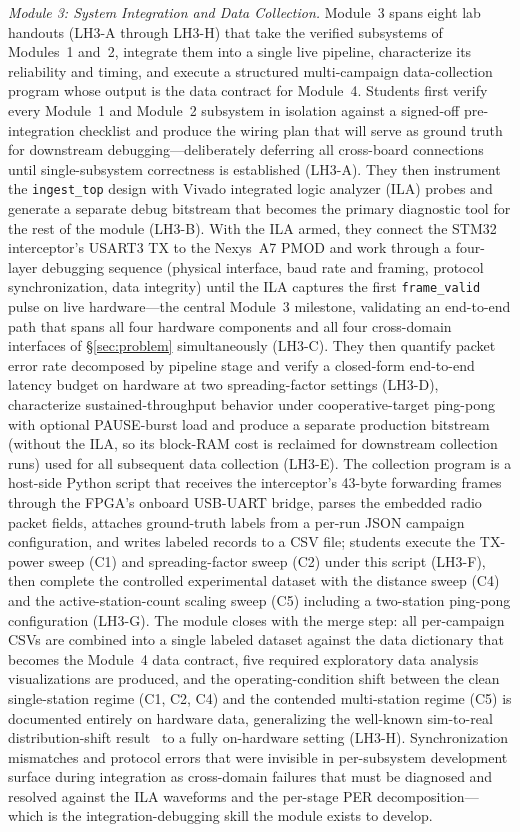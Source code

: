 \documentclass[conference]{IEEEtran}
\begin{document}
\textit{Module 3: System Integration and Data Collection.} Module~3 spans eight lab handouts (LH3-A through LH3-H) that take the verified subsystems of Modules~1 and~2, integrate them into a single live pipeline, characterize its reliability and timing, and execute a structured multi-campaign data-collection program whose output is the data contract for Module~4. Students first verify every Module~1 and Module~2 subsystem in isolation against a signed-off pre-integration checklist and produce the wiring plan that will serve as ground truth for downstream debugging---deliberately deferring all cross-board connections until single-subsystem correctness is established (LH3-A). They then instrument the \texttt{ingest\_top} design with Vivado integrated logic analyzer (ILA) probes and generate a separate debug bitstream that becomes the primary diagnostic tool for the rest of the module (LH3-B). With the ILA armed, they connect the STM32 interceptor's USART3 TX to the Nexys~A7 PMOD and work through a four-layer debugging sequence (physical interface, baud rate and framing, protocol synchronization, data integrity) until the ILA captures the first \texttt{frame\_valid} pulse on live hardware---the central Module~3 milestone, validating an end-to-end path that spans all four hardware components and all four cross-domain interfaces of \S\ref{sec:problem} simultaneously (LH3-C). They then quantify packet error rate decomposed by pipeline stage and verify a closed-form end-to-end latency budget on hardware at two spreading-factor settings (LH3-D), characterize sustained-throughput behavior under cooperative-target ping-pong with optional PAUSE-burst load and produce a separate production bitstream (without the ILA, so its block-RAM cost is reclaimed for downstream collection runs) used for all subsequent data collection (LH3-E). The collection program is a host-side Python script that receives the interceptor's 43-byte forwarding frames through the FPGA's onboard USB-UART bridge, parses the embedded radio packet fields, attaches ground-truth labels from a per-run JSON campaign configuration, and writes labeled records to a CSV file; students execute the TX-power sweep (C1) and spreading-factor sweep (C2) under this script (LH3-F), then complete the controlled experimental dataset with the distance sweep (C4) and the active-station-count scaling sweep (C5) including a two-station ping-pong configuration (LH3-G). The module closes with the merge step: all per-campaign CSVs are combined into a single labeled dataset against the data dictionary that becomes the Module~4 data contract, five required exploratory data analysis visualizations are produced, and the operating-condition shift between the clean single-station regime (C1, C2, C4) and the contended multi-station regime (C5) is documented entirely on hardware data, generalizing the well-known sim-to-real distribution-shift result~\cite{b6} to a fully on-hardware setting (LH3-H). Synchronization mismatches and protocol errors that were invisible in per-subsystem development surface during integration as cross-domain failures that must be diagnosed and resolved against the ILA waveforms and the per-stage PER decomposition---which is the integration-debugging skill the module exists to develop.
\end{document}
